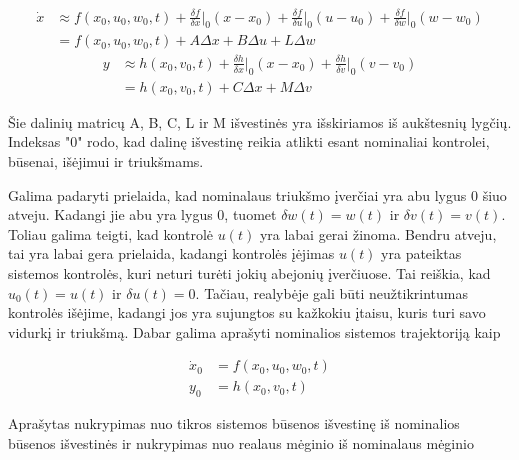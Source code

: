     \begin{equation}
        \begin{aligned}
            \dot{x} &\approx f(x_0, u_0, w_0, t) + \frac{\delta f}{\delta x}\Bigr|_{0} (x-x_0) + \frac{\delta f}{\delta u}\Bigr|_{0} (u-u_0) + \frac{\delta f}{\delta w}\Bigr|_{0} (w-w_0) \\
            &= f(x_0, u_0, w_0, t) + A\Delta x + B \Delta u + L \Delta w
        \end{aligned}
    \end{equation}
    \begin{equation}
        \begin{aligned}
            y &\approx h(x_0, v_0, t) + \frac{\delta h}{\delta x}\Bigr|_{0}(x-x_0) + \frac{\delta h}{\delta v}\Bigr|_{0}(v-v_0) \\
            &= h(x_0, v_0, t) + C \Delta x + M \Delta v
        \end{aligned}
    \end{equation}

    Šie dalinių matricų A, B, C, L ir M išvestinės yra išskiriamos iš aukštesnių lygčių.
    Indeksas "0" rodo, kad dalinę išvestinę reikia atlikti esant nominaliai kontrolei, būsenai, išėjimui ir triukšmams.

    Galima padaryti prielaida, kad nominalaus triukšmo įverčiai yra abu lygus 0 šiuo atveju.
    Kadangi jie abu yra lygus 0, tuomet $\delta w(t) = w(t)$ ir $\delta v(t) = v(t)$.
    Toliau galima teigti, kad kontrolė $u(t)$ yra labai gerai žinoma.
    Bendru atveju, tai yra labai gera prielaida, kadangi kontrolės įėjimas $u(t)$ yra pateiktas sistemos kontrolės, kuri neturi turėti jokių abejonių įverčiuose.
    Tai reiškia, kad $u_0(t) = u(t)$ ir $\delta u(t) = 0$.
    Tačiau, realybėje gali būti neužtikrintumas kontrolės išėjime, kadangi jos yra sujungtos su kažkokiu įtaisu, kuris turi savo vidurkį ir triukšmą.
    Dabar galima aprašyti nominalios sistemos trajektoriją kaip

    \begin{equation}
        \label{eq:nominal_sistem_trajektory}
        \begin{aligned}
            \dot{x}_0 &= f(x_0, u_0, w_0, t) \\
            y_0 &= h(x_0, v_0, t)
        \end{aligned}
    \end{equation}

    Aprašytas nukrypimas nuo tikros sistemos būsenos išvestinę iš nominalios būsenos išvestinės ir nukrypimas nuo realaus mėginio iš nominalaus mėginio

